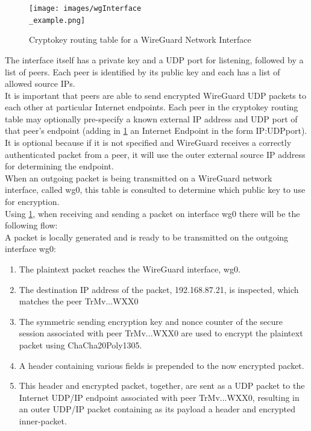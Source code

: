 \begin{figure}[H]
    \vspace{0.5cm}
    \texttt{[image: images/wgInterface\\\_example.png]}
    \caption{Cryptokey routing table for a WireGuard Network Interface}
    \label{fig:WGinterface} %
\end{figure}

The interface itself has a private key and a UDP port for listening, followed by a list of peers. Each peer is identified by its public key and each has a list of allowed source IPs.\\
It is important that peers are able to send encrypted WireGuard UDP packets to each other at particular Internet endpoints. Each peer in the cryptokey routing table may optionally pre-specify a known external IP address and UDP port of that peer’s endpoint (adding in \ref{fig:WGinterface} an Internet Endpoint in the form IP:UDPport).
It is optional because if it is not specified and WireGuard receives a correctly authenticated packet from a peer, it will use the outer external source IP
address for determining the endpoint.\\
When an outgoing packet is being transmitted on a WireGuard network interface, called wg0, this table is consulted to determine which public key to use for encryption.\\
Using \ref{fig:WGinterface}, when receiving and sending a packet on interface wg0 there will be the following flow:\\
A packet is locally generated and is ready to be transmitted on the outgoing interface wg0:
\begin{enumerate}
    \item The plaintext packet reaches the WireGuard interface, wg0.
    \item The destination IP address of the packet, 192.168.87.21, is inspected, which matches the peer TrMv...WXX0
    \item The symmetric sending encryption key and nonce counter of the secure session associated with peer TrMv...WXX0 are used to encrypt the plaintext packet using ChaCha20Poly1305.
    \item A header containing various fields is prepended to the now encrypted packet.
    \item This header and encrypted packet, together, are sent as a UDP packet to the Internet UDP/IP endpoint associated with peer TrMv...WXX0, resulting in an outer UDP/IP packet containing as its payload a header and encrypted inner-packet. 
\end{enumerate}
